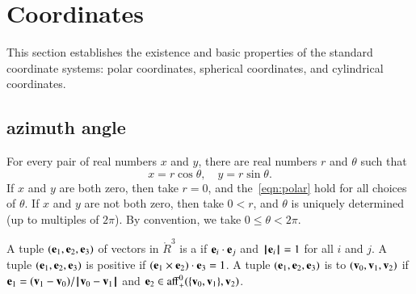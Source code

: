 \section{Coordinates}

This section establishes the existence and basic properties of the
standard coordinate systems: polar coordinates, spherical coordinates,
and cylindrical coordinates.  
%
%
%
%

\subsection{azimuth angle}

\label{sec:polar}
%
%


For every pair of real numbers $x$ and $y$,  there are real numbers
$r$ and $\theta$ such that
\begin{equation}\label{eqn:polar}
x = r\cos\theta,\quad y = r\sin\theta.
\end{equation}
If $x$ and $y$ are both zero, then take $r=0$, and
the~\eqref{eqn:polar} hold for all choices of $\theta$. If $x$ and $y$
are not both zero, then take $0<r$, and $\theta$ is uniquely
determined (up to multiples of $2\pi$).  By convention, we take $0\le\theta <
2\pi$.  
%
%






\begin{definition}
A tuple $({\mathbf e}_1,{\mathbf e}_2,{\mathbf e}_3)$ of vectors in $\ring{R}^3$ is a 
 if ${\mathbf e}_i\cdot {\mathbf e}_j$ and ${{\hskip0.1em|\hskip-0.15em|\hskip0.1em}{\mathbf e}_i{\hskip0.1em|\hskip-0.15em|\hskip0.1em}}=1$ 
for all $i$ and $j$.
A tuple $({\mathbf e}_1,{\mathbf e}_2,{\mathbf e}_3)$ is positive if $({\mathbf e}_1\times {\mathbf e}_2)\cdot{\mathbf e}_3=1$.
A tuple $({\mathbf e}_1,{\mathbf e}_2,{\mathbf e}_3)$ is  to $({\mathbf v}_0,{\mathbf v}_1,{\mathbf v}_2)$ if
$\e_1 = (\v_1-\v_0)/\norm{\v_0}{\v_1}$ and
${\mathbf e}_2\in{\operatorname{aff}}_+^0(\{{\mathbf v}_0,{\mathbf v}_1\},{\mathbf v}_2)$.
\end{definition}
%
%

